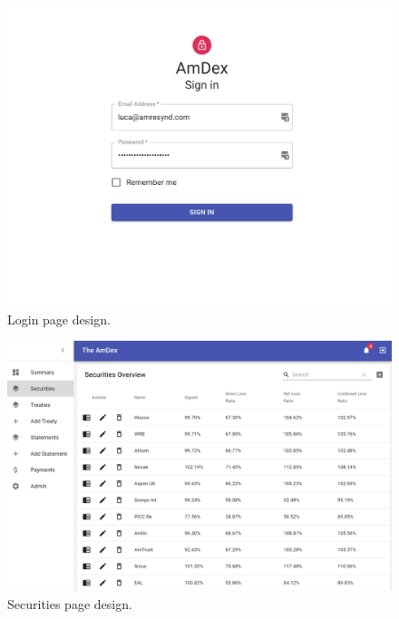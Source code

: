 \documentclass[12pt]{article}
\begin{document}
\begin{figure}
    \includegraphics[width=\linewidth]{login.png}
    \caption{Login page design.}
    \label{fig:login}
\end{figure}

\begin{figure}
    \includegraphics[width=\linewidth]{securities.png}
    \caption{Securities page design.}
    \label{fig:securities}
\end{figure}



\end{document}
